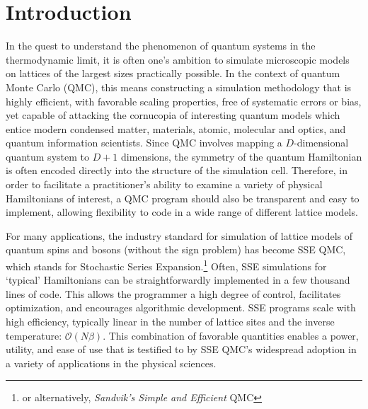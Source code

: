 \documentclass[vecphys]{svmult}
\begin{document}
\section{Introduction}
\label{Melko:sec:1}
In the quest to understand the phenomenon of quantum systems in the thermodynamic limit, it is often one's ambition to simulate
microscopic models on lattices of the largest sizes practically possible.  In the context of quantum Monte Carlo (QMC), this means
constructing a simulation methodology that is highly efficient, with favorable scaling properties, free of systematic errors or bias, yet capable of attacking the cornucopia of interesting quantum models which entice modern condensed matter, materials, atomic, molecular and optics, and quantum information scientists.
Since QMC involves mapping a $D$-dimensional quantum system to $D+1$ dimensions, the symmetry of the quantum Hamiltonian is often encoded directly into the structure of the simulation cell.  Therefore, in order to facilitate a practitioner's ability to examine a variety of physical Hamiltonians of interest, a QMC program should also be transparent and easy to implement, allowing flexibility to code in a wide range of different lattice models. 

For many applications, the industry standard for simulation of lattice models of quantum spins and bosons (without the sign problem) has become SSE QMC, which stands for Stochastic Series Expansion.\footnote{or alternatively, \textit{Sandvik's Simple and Efficient} QMC}   Often, SSE simulations for \lq typical' Hamiltonians can be straightforwardly implemented in a few thousand lines of code.
This allows the programmer a high degree of control, facilitates optimization, and encourages algorithmic development.
SSE programs scale with high efficiency, typically linear in the number of lattice sites and the inverse temperature: $\mathcal{O}(N\beta)$.  This combination of favorable quantities enables a power, utility, and ease of use that is testified to by SSE QMC's widespread adoption in a variety of applications in the physical sciences.
\end{document}
